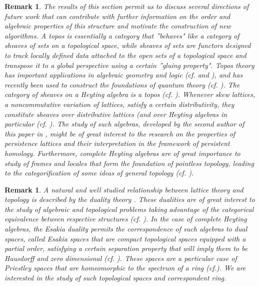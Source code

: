 \documentclass[10pt]{amsart}
\newtheorem{remark}[theorem]{Remark}
\begin{document}
\begin{remark}
The results of this section permit us to discuss several directions of future work that can contribute with further information on the order and algebraic properties of this structure and motivate the construction of new algorithms. 
A \emph{topos} is essentially a category that ''behaves" like a category of sheaves of sets on a topological space, while \emph{sheaves} of sets are functors designed to track locally defined data attached to the open sets of a topological space and transpose it to a global perspective using a certain ''gluing property". 
Topos theory has important applications in algebraic geometry and logic (cf. \cite{Lang} and \cite{Joh86}), and has recently been used to construct the foundations of quantum theory (cf. \cite{Is08}).
The category of sheaves on a Heyting algebra is a topos (cf. \cite{CatCS}).
Whenever skew lattices, a noncommutative variation of lattices, satisfy a certain distributivity, they constitute sheaves over distributive lattices (and over Heyting algebras in particular (cf. \cite{Ba13}). 
The study of such algebras, developed by the second author of this paper in \cite{Le13}, might be of great interest to the research on the properties of persistence lattices and their interpretation in the framework of persistent homology.
Furthermore, complete Heyting algebras are of great importance to study of frames and locales that form the foundation of pointless topology, leading to the categorification of some ideas of general topology (cf. \cite{Joh86}).
\end{remark}


\begin{remark}
A natural and well studied relationship between lattice theory and topology is described by the duality theory \cite{Da02}.  
These dualities are of great interest to the study of algebraic and topological problems taking advantage of the categorical equivalence between respective structures (cf. \cite{Fa96}).
In the case of complete Heyting algebras, the Esakia duality permits the correspondence of such algebras to dual spaces, called \emph{Esakia spaces} that are compact topological spaces equipped with a partial order, satisfying a certain separation property that will imply them to be Hausdorff and zero dimensional (cf. \cite{Be06}).  
These spaces are a particular case of \emph{Priestley spaces} that are homeomorphic to the spectrum of a ring (cf.\cite{Be10}). 
We are interested in the study of such topological spaces and correspondent ring. 
\end{remark}
\end{document}
